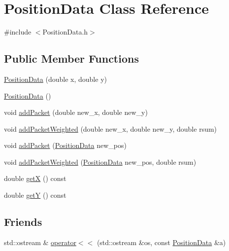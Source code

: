 \hypertarget{class_position_data}{}\section{Position\+Data Class Reference}
\label{class_position_data}


{\ttfamily \#include $<$Position\+Data.\+h$>$}

\subsection*{Public Member Functions}
\begin{DoxyCompactItemize}
\item 
\hyperlink{class_position_data_aa75a187755786ab9fa25f7c388137adf}{Position\+Data} (double x, double y)
\item 
\hyperlink{class_position_data_adea0ed723003a859d7d7259ca84edfc4}{Position\+Data} ()
\item 
void \hyperlink{class_position_data_a3e4f05b934529a9fcb7aa21c92d3a22e}{add\+Packet} (double new\+\_\+x, double new\+\_\+y)
\item 
void \hyperlink{class_position_data_a6acc2e96cfaf138628c532986ee47de4}{add\+Packet\+Weighted} (double new\+\_\+x, double new\+\_\+y, double rsum)
\item 
void \hyperlink{class_position_data_a89d63ca49d6be83f882812001b83a682}{add\+Packet} (\hyperlink{class_position_data}{Position\+Data} new\+\_\+pos)
\item 
void \hyperlink{class_position_data_ad96efe1394b2ae79f24fe4e934f11307}{add\+Packet\+Weighted} (\hyperlink{class_position_data}{Position\+Data} new\+\_\+pos, double rsum)
\item 
double \hyperlink{class_position_data_a87eb59dc791fcdeec60820092959dd98}{getX} () const
\item 
double \hyperlink{class_position_data_a2eefc1ca36082bf9e53999c86582b1d1}{getY} () const
\end{DoxyCompactItemize}
\subsection*{Friends}
\begin{DoxyCompactItemize}
\item 
std\+::ostream \& \hyperlink{class_position_data_a67be412af90b9acf2067c5a7c8904462}{operator$<$$<$} (std\+::ostream \&os, const \hyperlink{class_position_data}{Position\+Data} \&a)
\end{DoxyCompactItemize}


